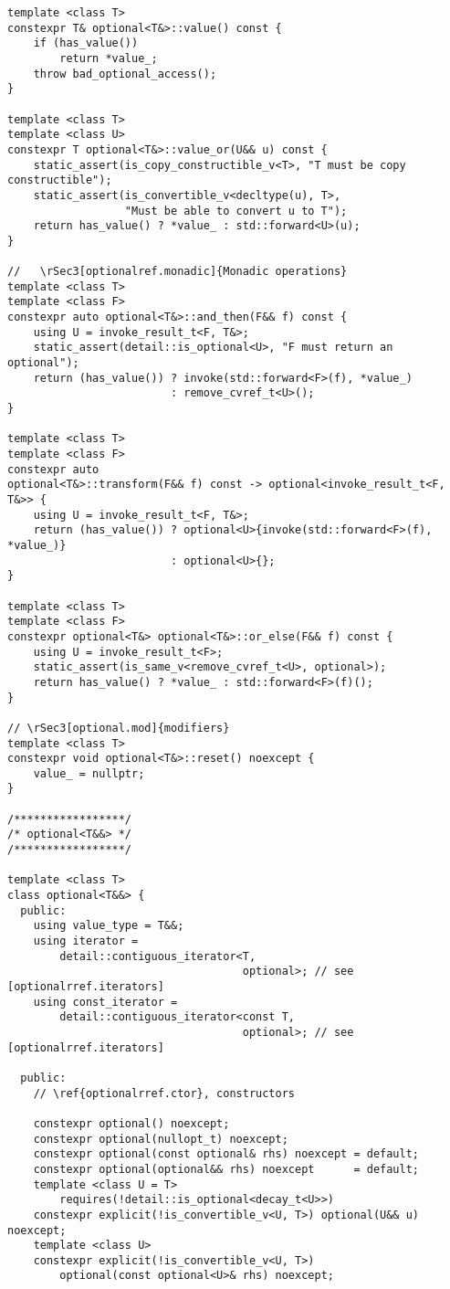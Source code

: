 \documentclass[a4paper,10pt,oneside,openany,final,article]{memoir}
\begin{document}
\begin{verbatim}
template <class T>
constexpr T& optional<T&>::value() const {
    if (has_value())
        return *value_;
    throw bad_optional_access();
}

template <class T>
template <class U>
constexpr T optional<T&>::value_or(U&& u) const {
    static_assert(is_copy_constructible_v<T>, "T must be copy constructible");
    static_assert(is_convertible_v<decltype(u), T>,
                  "Must be able to convert u to T");
    return has_value() ? *value_ : std::forward<U>(u);
}

//   \rSec3[optionalref.monadic]{Monadic operations}
template <class T>
template <class F>
constexpr auto optional<T&>::and_then(F&& f) const {
    using U = invoke_result_t<F, T&>;
    static_assert(detail::is_optional<U>, "F must return an optional");
    return (has_value()) ? invoke(std::forward<F>(f), *value_)
                         : remove_cvref_t<U>();
}

template <class T>
template <class F>
constexpr auto
optional<T&>::transform(F&& f) const -> optional<invoke_result_t<F, T&>> {
    using U = invoke_result_t<F, T&>;
    return (has_value()) ? optional<U>{invoke(std::forward<F>(f), *value_)}
                         : optional<U>{};
}

template <class T>
template <class F>
constexpr optional<T&> optional<T&>::or_else(F&& f) const {
    using U = invoke_result_t<F>;
    static_assert(is_same_v<remove_cvref_t<U>, optional>);
    return has_value() ? *value_ : std::forward<F>(f)();
}

// \rSec3[optional.mod]{modifiers}
template <class T>
constexpr void optional<T&>::reset() noexcept {
    value_ = nullptr;
}

/*****************/
/* optional<T&&> */
/*****************/

template <class T>
class optional<T&&> {
  public:
    using value_type = T&&;
    using iterator =
        detail::contiguous_iterator<T,
                                    optional>; // see [optionalrref.iterators]
    using const_iterator =
        detail::contiguous_iterator<const T,
                                    optional>; // see [optionalrref.iterators]

  public:
    // \ref{optionalrref.ctor}, constructors

    constexpr optional() noexcept;
    constexpr optional(nullopt_t) noexcept;
    constexpr optional(const optional& rhs) noexcept = default;
    constexpr optional(optional&& rhs) noexcept      = default;
    template <class U = T>
        requires(!detail::is_optional<decay_t<U>>)
    constexpr explicit(!is_convertible_v<U, T>) optional(U&& u) noexcept;
    template <class U>
    constexpr explicit(!is_convertible_v<U, T>)
        optional(const optional<U>& rhs) noexcept;


\end{verbatim}
\end{document}
